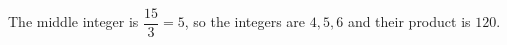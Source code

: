 The middle integer is $\dfrac{15}{3}=5$, so the integers are $4,5,6$ and their product is $\boxed{120}$.
